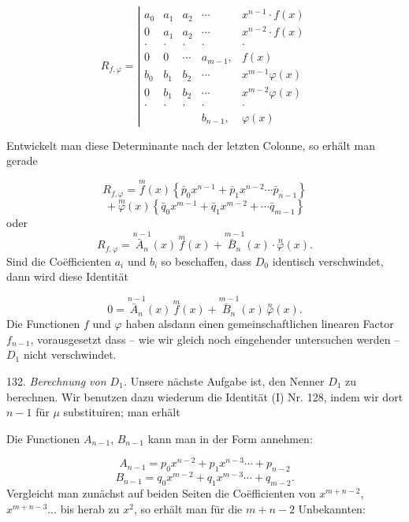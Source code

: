 \[
R_{f,\varphi} = \left|
\begin{array}{ccccc}
a_0 & a_1 & a_2 & \cdots & x^{n-1}\cdot f(x)\\
0 & a_1 & a_2 & \cdots & x^{n-2}\cdot f(x)\\
\cdot & \cdot & \cdot & \cdot & \cdot\\
0 & 0 & \cdots & a_{m-1}, & f(x)\\
b_0 & b_1 & b_2 & \cdots & x^{m-1}\varphi(x)\\
0 & b_1 & b_2 & \cdots & x^{m-2}\varphi(x)\\
\cdot & \cdot & \cdot & \cdot & \cdot\\
 & & & b_{n-1}, & \varphi(x)
\end{array}
\right.
\]



Entwickelt man diese Determinante nach der letzten Colonne, so erhält man gerade

\[
R_{f,\varphi} = \overset{m}{f}(x)\left\{\bar p_0 x^{n-1}+\bar p_1 x^{n-2}\cdots \bar p_{n-1}\right\}
\]
\[
{}+ \overset{m}{\varphi}(x)\left\{\bar q_0 x^{m-1}+\bar q_1 x^{m-2}+\cdots \bar q_{m-1}\right\}
\]
oder
\[
R_{f,\varphi} = \overset{n-1}{\bar A_n}(x)\,\overset{m}{f}(x) + \overset{m-1}{\bar B_n}(x)\cdot \overset{n}{\varphi}(x).
\]
Sind die Co\"efficienten $a_i$ und $b_i$ so beschaffen, dass $D_0$ identisch verschwindet, dann wird diese Identität

\[
0 = \overset{n-1}{\bar A_n}(x)\,\overset{m}{f}(x) + \overset{m-1}{\bar B_n}(x)\,\overset{n}{\varphi}(x).
\]
Die Functionen $f$ und $\varphi$ haben alsdann einen gemeinschaftlichen linearen Factor $f_{n-1}$, vorausgesetzt dass -- wie wir gleich noch eingehender untersuchen werden -- $D_1$ nicht verschwindet.

132. \textit{Berechnung von $D_1$.} Unsere nächste Aufgabe ist, den Nenner $D_1$ zu berechnen. Wir benutzen dazu wiederum die Identität (I) Nr. 128, indem wir dort $n-1$ für $\mu$ substituiren; man erhält


Die Functionen $A_{n-1}$, $B_{n-1}$ kann man in der Form annehmen:

\[
A_{n-1} = p_0 x^{n-2} + p_1 x^{n-3}\cdots + p_{n-2}
\]
\[
B_{n-1} = q_0 x^{m-2} + q_1 x^{m-3}\cdots + q_{m-2}.
\]
Vergleicht man zunächst auf beiden Seiten die Co\"efficienten von $x^{m+n-2}$, $x^{m+n-3}\ldots$ bis herab zu $x^2$, so erhält man für die $m+n-2$ Unbekannten:

